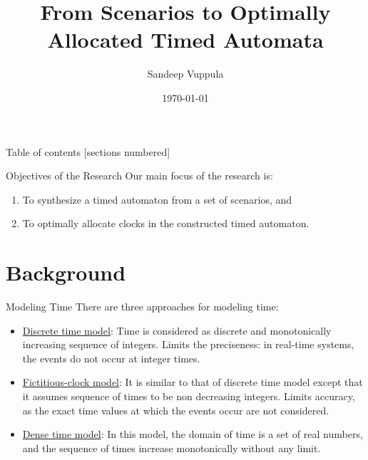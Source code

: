 \documentclass[10pt]{beamer}
\title{From Scenarios to Optimally Allocated Timed Automata}
\date{\today}
\author{Sandeep Vuppula}
\institute{University of Minnesota Duluth}
\theoremstyle{plain}
\theoremstyle{definition}
\begin{document}
\maketitle

\begin{frame}{Table of contents}
  [sections numbered]
  \tableofcontents[hideallsubsections]
\end{frame}

\begin{frame}{Objectives of the Research}
	Our main focus of the research is:
	\begin{enumerate}
		\item	To synthesize a timed automaton from a set of scenarios, and
		\item	To optimally allocate clocks in the constructed timed automaton.
	\end{enumerate}
\end{frame}

\section{Background}


\begin{frame}{Modeling Time}
	There are three approaches for modeling time:
	\begin{itemize}		
		\item \underline{Discrete time model}: Time is considered as discrete and monotonically increasing sequence of integers. Limits the preciseness: in real-time systems, the events do not occur at integer times.
		\item \underline{Fictitious-clock model}: It is similar to that of discrete time model except that it assumes sequence of times to be non decreasing integers. Limits accuracy, as the exact time values at which the events occur are not considered. 
		\item \underline{Dense time model}: In this model, the domain of time is a set of real numbers, and the sequence of times increase monotonically without any limit. %
	\end{itemize}
\end{frame}
\end{document}

